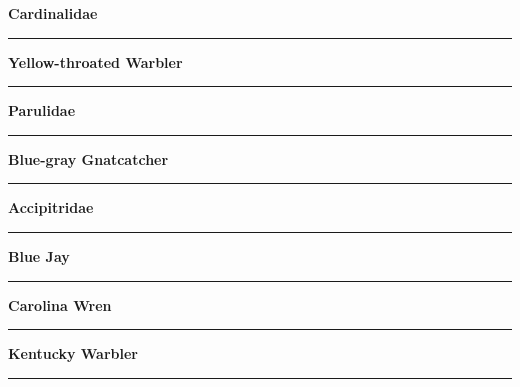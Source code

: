 \documentclass[11pt]{exam}
\newcommand*\Matching[1]{
\ifprintanswers
	\textbf{#1}
\else
	\rule{2.5in}{0.4pt}
\fi
}
\newlength\matchlena
\newlength\matchlenb
\newcommand\MatchQuestion[2]{%
	\setlength\matchlenb{\linewidth}
	\addtolength\matchlenb{-\matchlena}
	\parbox[t]{\matchlena}{\Matching{#1}}\enspace\parbox[t]{\matchlenb}{#2}}
\begin{document}
\begin{questions}
\begin{multicols}{2}
\question\MatchQuestion{Cardinalidae}{}
\vspace{2\baselineskip}
%
\question\MatchQuestion{Yellow-throated Warbler}{}
\vspace{2\baselineskip}
%
\question\MatchQuestion{Parulidae}{}
\vspace{2\baselineskip}
%
\question\MatchQuestion{Blue-gray Gnatcatcher}{}
\vspace{2\baselineskip}
%
\question\MatchQuestion{Accipitridae}{}
\vspace{2\baselineskip}
%
\question[\textsc{ec}]\MatchQuestion{Blue Jay}{}
\vspace{2\baselineskip}
%
\question[\textsc{ec}]\MatchQuestion{Carolina Wren}{}
\vspace{2\baselineskip}
%
\question[\textsc{ec}]\MatchQuestion{Kentucky Warbler}{}
%
%
%
%
%
%
%
%
%
%
%
%
%
%
%
%
%
%
%
%
%
%
%

\end{multicols}

\end{questions}
\end{document}
